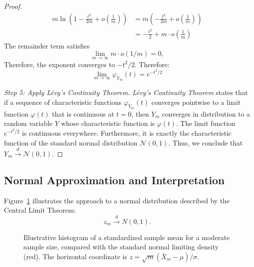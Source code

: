 \begin{proof}
\begin{equation}
\begin{aligned}
m \ln\left( 1 - \frac{t^2}{2m} + o\left( \frac{1}{m} \right) \right) &= m \left( -\frac{t^2}{2m} + o\left( \frac{1}{m} \right) \right) \\
&= -\frac{t^2}{2} + m \cdot o\left( \frac{1}{m} \right)
\end{aligned}
\end{equation}
The remainder term satisfies
\[
\lim_{m \to \infty} m \cdot o(1/m) = 0,
\]
Therefore, the exponent converges to $-t^2/2$. Therefore:
\begin{equation}
\lim_{m \to \infty} \varphi_{Y_m}(t) = e^{-t^2/2}
\end{equation}

\textit{Step 5: Apply Lévy's Continuity Theorem.}
\textit{Lévy's Continuity Theorem} states that if a sequence of characteristic functions $\varphi_{Y_m}(t)$ converges pointwise to a limit function $\varphi(t)$ that is continuous at $t=0$, then $Y_m$ converges in distribution to a random variable $Y$ whose characteristic function is $\varphi(t)$.
The limit function $e^{-t^2/2}$ is continuous everywhere. Furthermore, it is exactly the characteristic function of the standard normal distribution $\mathcal{N}(0,1)$.
Thus, we conclude that $Y_m \xrightarrow{d} \mathcal{N}(0, 1)$. \end{proof}

\subsection{Normal Approximation and Interpretation}

Figure~\ref{fig:ch16-clt} illustrates the approach to a normal distribution described by the Central Limit Theorem:
\[
z_m \xrightarrow{d} N(0,1).
\]

\begin{figure}[!htbp]
\centering
{}
\caption[Central Limit Theorem]{Illustrative histogram of a standardized sample mean for a moderate sample size, compared with the standard normal limiting density (red). The horizontal coordinate is $z=\sqrt{m}(\bar X_m-\mu)/\sigma$.}
\label{fig:ch16-clt}
\end{figure}

